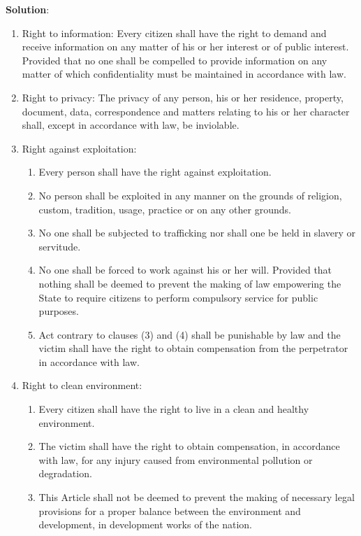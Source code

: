 \documentclass[
  openany]{book}
\newenvironment{solution}{ {\bfseries Solution}:}{}
\begin{document}
\begin{questions}
\begin{solution}
\begin{enumerate}
\item Right to information: Every citizen shall have the right to demand and receive information on any matter of his or her interest or of public interest. Provided that no one shall be compelled to provide information on any matter of which confidentiality must be maintained in accordance with law.
\item Right to privacy: The privacy of any person, his or her residence, property, document, data, correspondence and matters relating to his or her character shall, except in accordance with law, be inviolable.
\item Right against exploitation:
\begin{enumerate}
\item Every person shall have the right against exploitation.
\item No person shall be exploited in any manner on the grounds of religion, custom, tradition, usage, practice or on any other grounds.
\item No one shall be subjected to trafficking nor shall one be held in slavery or servitude.
\item No one shall be forced to work against his or her will. Provided that nothing shall be deemed to prevent the making of law empowering the State to require citizens to perform compulsory service for public purposes.
\item Act contrary to clauses (3) and (4) shall be punishable by law and the victim shall have the right to obtain compensation from the perpetrator in accordance with law.
\end{enumerate}

\item Right to clean environment:
\begin{enumerate}
\item Every citizen shall have the right to live in a clean and healthy environment.
\item The victim shall have the right to obtain compensation, in accordance with law, for any injury caused from environmental pollution or degradation.
\item This Article shall not be deemed to prevent the making of necessary legal provisions for a proper balance between the environment and development, in development works of the nation.
\end{enumerate}


\end{enumerate}
\end{solution}
\end{questions}
\end{document}
